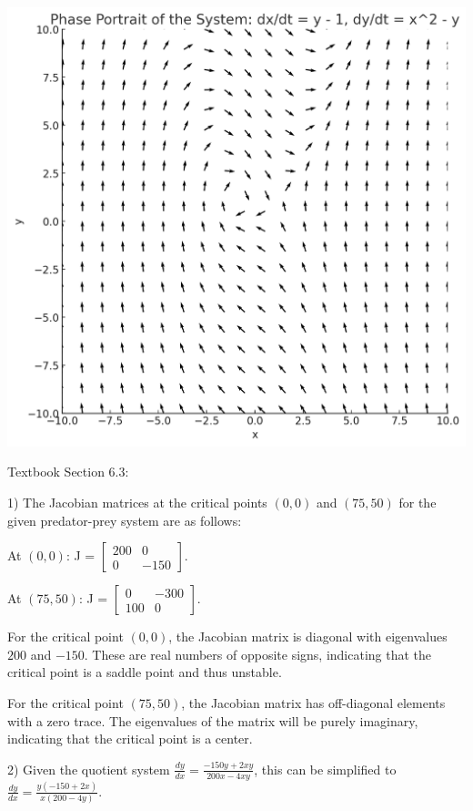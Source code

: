 \documentclass{article}
\begin{document}
\includegraphics[width=\linewidth]{6_2_30}

Textbook Section 6.3:

1) The Jacobian matrices at the critical points $(0, 0)$ and
$(75, 50)$ for the given predator-prey system are as follows:

At $(0, 0)$:
J = $\begin{bmatrix}
    200 & 0 \\
    0 & -150
\end{bmatrix}$.

At $(75, 50)$:
J = $\begin{bmatrix}
    0 & -300 \\
    100 & 0
\end{bmatrix}$.

For the critical point $(0, 0)$, the Jacobian matrix is diagonal
with eigenvalues $200$ and $-150$. These are real numbers of opposite
signs, indicating that the critical point is a saddle point and thus
unstable.

For the critical point $(75, 50)$, the Jacobian matrix has off-diagonal
elements with a zero trace. The eigenvalues of the matrix will be purely
imaginary, indicating that the critical point is a center.

2) Given the quotient system $\frac{dy}{dx} = \frac{-150y + 2xy}{200x - 4xy}$,
this can be simplified to
$\frac{dy}{dx} = \frac{y(-150 + 2x)}{x(200 - 4y)}$.
\end{document}
